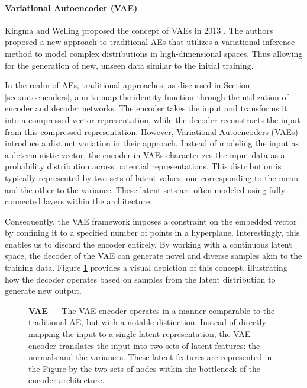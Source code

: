 \paragraph{Variational Autoencoder (VAE)} \label{sec:vae}

Kingma and Welling proposed the concept of \acfp{VAE} in 2013 \cite{kingma_auto-encoding_2022}. The authors proposed a new approach to traditional \acp{AE} that utilizes a variational inference method to model complex distributions in high-dimensional spaces. Thus allowing for the generation of new, unseen data similar to the initial training.

In the realm of \acp{AE}, traditional approaches, as discussed in Section \ref{sec:autoencoders}, aim to map the identity function through the utilization of encoder and decoder networks. The encoder takes the input and transforms it into a compressed vector representation, while the decoder reconstructs the input from this compressed representation. However, Variational Autoencoders (\acp{VAE}) introduce a distinct variation in their approach. Instead of modeling the input as a deterministic vector, the encoder in \acp{VAE} characterizes the input data as a probability distribution across potential representations. This distribution is typically represented by two sets of latent values: one corresponding to the mean and the other to the variance. These latent sets are often modeled using fully connected layers within the architecture.

Consequently, the \ac{VAE} framework imposes a constraint on the embedded vector by confining it to a specified number of points in a hyperplane. Interestingly, this enables us to discard the encoder entirely. By working with a continuous latent space, the decoder of the \ac{VAE} can generate novel and diverse samples akin to the training data. Figure \ref{fig:vae} provides a visual depiction of this concept, illustrating how the decoder operates based on samples from the latent distribution to generate new output.

\begin{figure}[ht]
    \centering
    \caption[Variational autoencoder]{\textbf{\Acf{VAE}} --- The \ac{VAE} encoder operates in a manner comparable to the traditional \ac{AE}, but with a notable distinction. Instead of directly mapping the input to a single latent representation, the \ac{VAE} encoder translates the input into two sets of latent features: the normals and the variances. These latent features are represented in the Figure by the two sets of nodes within the bottleneck of the encoder architecture.}
    \label{fig:vae}
\end{figure}

